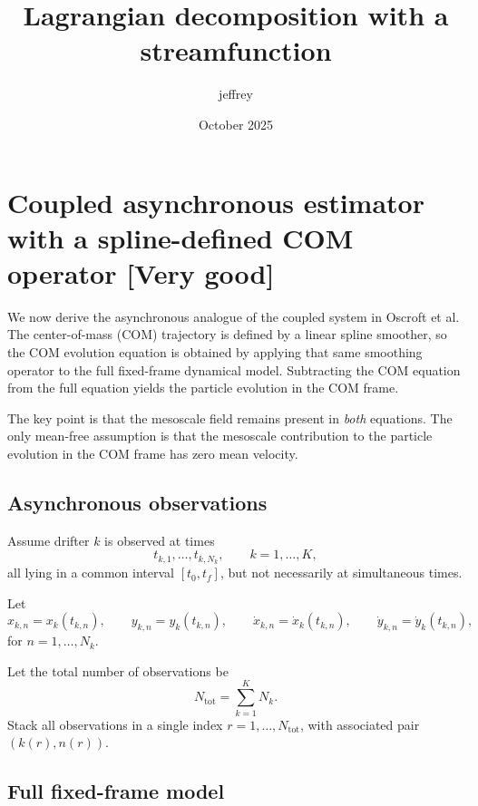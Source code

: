 \documentclass{article}
\title{Lagrangian decomposition with a streamfunction}
\author{jeffrey }
\date{October 2025}
\begin{document}
\maketitle

\section{Coupled asynchronous estimator with a spline-defined COM operator [Very good]}

We now derive the asynchronous analogue of the coupled system in Oscroft et al.
The center-of-mass (COM) trajectory is defined by a linear spline smoother, so the COM
evolution equation is obtained by applying that same smoothing operator to the full
fixed-frame dynamical model. Subtracting the COM equation from the full equation yields
the particle evolution in the COM frame.

The key point is that the mesoscale field remains present in \emph{both} equations.
The only mean-free assumption is that the mesoscale contribution to the particle evolution
in the COM frame has zero mean velocity.

\subsection{Asynchronous observations}

Assume drifter $k$ is observed at times
\begin{equation}
t_{k,1},\dots,t_{k,N_k}, \qquad k=1,\dots,K,
\end{equation}
all lying in a common interval $[t_0,t_f]$, but not necessarily at simultaneous times.

Let
\begin{equation}
x_{k,n}=x_k(t_{k,n}), \qquad y_{k,n}=y_k(t_{k,n}),
\qquad
\dot{x}_{k,n}=\dot{x}_k(t_{k,n}), \qquad \dot{y}_{k,n}=\dot{y}_k(t_{k,n}),
\end{equation}
for $n=1,\dots,N_k$.

Let the total number of observations be
\begin{equation}
N_{\mathrm{tot}}=\sum_{k=1}^K N_k.
\end{equation}
Stack all observations in a single index $r=1,\dots,N_{\mathrm{tot}}$, with associated pair
$(k(r),n(r))$.

\subsection{Full fixed-frame model}
\end{document}

